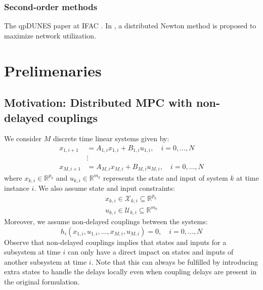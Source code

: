 \subsubsection{Second-order methods}
The qpDUNES paper at IFAC \cite{Frasch2014}. In \cite{Wei2013}, a distributed Newton method is proposed to maximize network utilization.

\section{Prelimenaries}

\subsection{Motivation: Distributed MPC with non-delayed couplings}
We consider $M$ discrete time linear systems given by:
\begin{subequations}
\begin{align}
x_{1,i+1} & = A_{1,i} x_{1,i} + B_{1,i} u_{1,i}, \quad i = 0,\dots,N \\
& \vdots \\
x_{M,i+1} & = A_{M,i} x_{M,i} + B_{M,i} u_{M,i}, \quad i = 0,\dots,N 
\end{align}
\end{subequations}
where $x_{k,i} \in \mathbb{R}^{p_{k}}$ and $u_{k,i} \in \mathbb{R}^{m_{k}}$ represents the state and input of system $k$ at time instance $i$. We also assume state and input constraints:
\begin{subequations}
\begin{align}
x_{k,i} \in \mathcal{X}_{k,i} \subseteq \mathbb{R}^{p_{k}} \\
u_{k,i} \in \mathcal{U}_{k,i} \subseteq \mathbb{R}^{m_{k}}
\end{align}
\end{subequations}
Moreover, we assume non-delayed couplings between the systems:
\begin{equation}
h_i(x_{1,i}, u_{1,i}, \dots, x_{M,i}, u_{M,i}) = 0, \quad i = 0,\dots,N
\end{equation}
Observe that non-delayed couplings implies that states and inputs for a subsystem at time $i$ can only have a direct impact on states and inputs of another subsystem at time $i$. Note that this can always be fulfilled by introducing extra states to handle the delays locally even when coupling delays are present in the original formulation.


